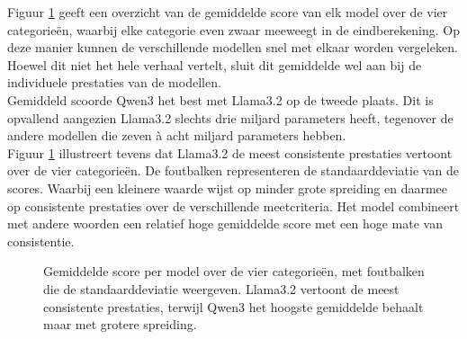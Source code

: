 Figuur \ref{fig:gemiddelde_score_per_model_met_sd} geeft een overzicht van de gemiddelde score van elk model over de vier categorieën, waarbij elke categorie even zwaar meeweegt in de eindberekening. Op deze manier kunnen de verschillende modellen snel met elkaar worden vergeleken. Hoewel dit niet het hele verhaal vertelt, sluit dit gemiddelde wel aan bij de individuele prestaties van de modellen.
\\[1em]
Gemiddeld scoorde Qwen3 het best met Llama3.2 op de tweede plaats. Dit is opvallend aangezien Llama3.2 slechts drie miljard parameters heeft, tegenover de andere modellen die zeven à acht miljard parameters hebben.
\\[1em]
Figuur \ref{fig:gemiddelde_score_per_model_met_sd} illustreert tevens dat Llama3.2 de meest consistente prestaties vertoont over de vier categorieën. De foutbalken representeren de standaarddeviatie van de scores. Waarbij een kleinere waarde wijst op minder grote spreiding en daarmee op consistente prestaties over de verschillende meetcriteria. Het model combineert met andere woorden een relatief hoge gemiddelde score met een hoge mate van consistentie.

\begin{figure}[H]
    \centering
    \caption{Gemiddelde score per model over de vier categorieën, met foutbalken die de standaarddeviatie weergeven. Llama3.2 vertoont de meest consistente prestaties, terwijl Qwen3 het hoogste gemiddelde behaalt maar met grotere spreiding.}
    \label{fig:gemiddelde_score_per_model_met_sd}
\end{figure}

